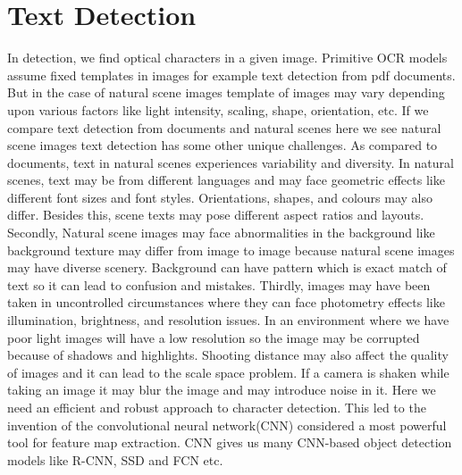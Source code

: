 \section{Text Detection}
In detection, we find optical characters in a given image. Primitive OCR models assume fixed templates in images for example text detection from pdf documents. But in the case of natural scene images template of images may vary depending upon various factors like light intensity, scaling, shape, orientation, etc. If we compare text detection from documents and natural scenes here we see natural scene images text detection has some other unique challenges. \cite{deep_learning_era} As compared to documents, text in natural scenes experiences variability and diversity. In natural scenes, text may be from different languages and may face geometric effects like different font sizes and font styles. Orientations, shapes, and colours may also differ. Besides this, scene texts may pose different aspect ratios and layouts. Secondly, Natural scene images may face abnormalities in the background like background texture may differ from image to image because natural scene images may have diverse scenery. Background can have pattern which is exact match of text so it can lead to confusion and mistakes. Thirdly, images may have been taken in uncontrolled circumstances where they can face photometry effects like illumination, brightness, and resolution issues. In an environment where we have poor light images will have a low resolution so the image may be corrupted because of shadows and highlights. Shooting distance may also affect the quality of images and it can lead to the scale space problem. If a camera is shaken while taking an image it may blur the image and may introduce noise in it. Here we need an efficient and robust approach to character detection. This led to the invention of the convolutional neural network(CNN) considered a most powerful tool for feature map extraction. CNN gives us many CNN-based object detection models like R-CNN, SSD and FCN etc. %


